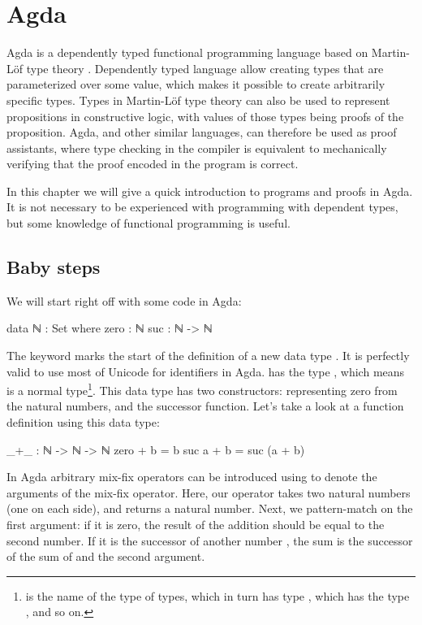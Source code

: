 \chapter{Agda} \label{Agda}

	Agda is a dependently typed functional programming language based on
	Martin-Löf type theory \cite{?}. Dependently typed language allow creating 
	types that are parameterized over some value, which makes it possible to 
	create arbitrarily specific types. Types in Martin-Löf type theory can also
	be used to represent propositions in constructive logic, with values of 
	those types being proofs of the proposition. Agda, and other similar 
	languages, can therefore be used as proof assistants, where type checking 
	in the compiler is equivalent to mechanically verifying that the proof 
	encoded in the program is correct.

	In this chapter we will give a quick introduction to programs and proofs in
	Agda. It is not necessary to be experienced with programming with dependent
	types, but some knowledge of functional programming is useful. 
	
	\section{Baby steps}
	
		We will start right off with some code in Agda:
	
		\begin{code}
			data ℕ : Set where
			  zero : ℕ
			  suc : ℕ -> ℕ
		\end{code}
	
		The keyword  marks the start of the definition of a new
		data type . It is perfectly valid to use most of Unicode for
		identifiers in Agda.  has the type , which means
		 is a normal type\footnote{ is the name of the
		type of types, which in turn has type , which has the type
		, and so on.}. This data type has two constructors:
		 representing zero from the natural numbers, and
		 the successor function.  Let's take a look at a function
		definition using this data type:
	
		\begin{code}
			_+_ : ℕ -> ℕ -> ℕ
			zero + b = b
			suc a + b = suc (a + b)
		\end{code}
	
		In Agda arbitrary mix-fix operators can be introduced using \codett{\_}
		to denote the arguments of the mix-fix operator. Here, our operator
		\codett{\_+\_} takes two natural numbers (one on each side), and
		returns a natural number. Next, we pattern-match on the first argument:
		if it is zero, the result of the addition should be equal to the second
		number. If it is the successor of another number , the sum is
		the successor of the sum of  and the second argument.
	
